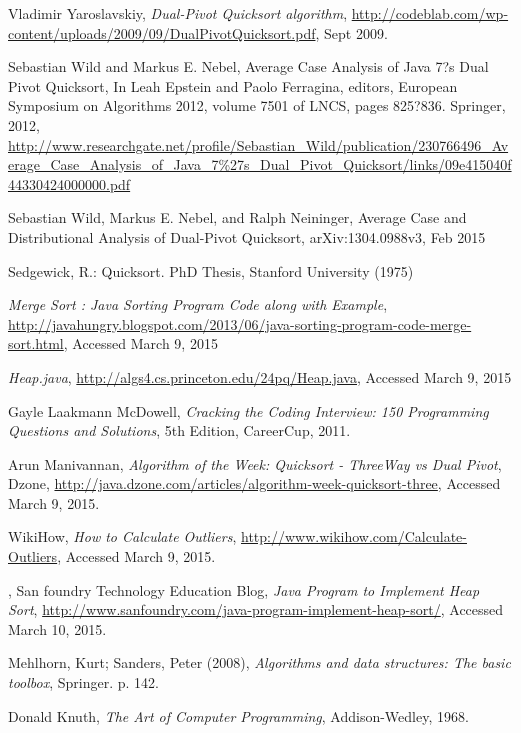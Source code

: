 \documentclass{article}
\begin{document}
\begin{thebibliography}{9}

  Vladimir Yaroslavskiy,
  \emph{Dual-Pivot Quicksort algorithm},
  \url{http://codeblab.com/wp-content/uploads/2009/09/DualPivotQuicksort.pdf},
  Sept 2009.
  
Sebastian Wild and Markus E. Nebel,
Average Case Analysis of Java 7?s Dual Pivot Quicksort,
In Leah Epstein and Paolo Ferragina, editors, 
European Symposium on Algorithms 2012, 
volume 7501 of LNCS, pages 825?836. Springer, 2012,
\url{http://www.researchgate.net/profile/Sebastian_Wild/publication/230766496_Average_Case_Analysis_of_Java_7%27s_Dual_Pivot_Quicksort/links/09e415040f44330424000000.pdf}

Sebastian Wild, Markus E. Nebel, and Ralph Neininger,
Average Case and Distributional Analysis of Dual-Pivot Quicksort,
arXiv:1304.0988v3, Feb 2015

Sedgewick, R.: Quicksort. PhD Thesis, Stanford University (1975)

\emph{Merge Sort : Java Sorting Program Code along with Example},
\url{http://javahungry.blogspot.com/2013/06/java-sorting-program-code-merge-sort.html},
Accessed March 9, 2015

\emph{Heap.java},
\url{http://algs4.cs.princeton.edu/24pq/Heap.java},
Accessed March 9, 2015

Gayle Laakmann McDowell, 
\emph{Cracking the Coding Interview: 150 Programming Questions and Solutions},
5th Edition,
CareerCup, 2011.

Arun Manivannan,
\emph{Algorithm of the Week: Quicksort - ThreeWay vs Dual Pivot},
Dzone,
\url{http://java.dzone.com/articles/algorithm-week-quicksort-three},
Accessed March 9, 2015.

WikiHow,
\emph{How to Calculate Outliers},
\url{http://www.wikihow.com/Calculate-Outliers},
Accessed March 9, 2015.

,
San foundry Technology Education Blog,
\emph{Java Program to Implement Heap Sort},
\url{http://www.sanfoundry.com/java-program-implement-heap-sort/},
Accessed March 10, 2015.

Mehlhorn, Kurt; Sanders, Peter (2008), 
\emph{Algorithms and data structures: The basic toolbox},
Springer. p. 142.

Donald Knuth, 
\emph{The Art of Computer Programming},
Addison-Wedley,
1968.

\end{thebibliography}
\end{document}
